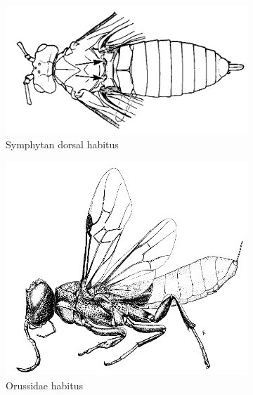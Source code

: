 \documentclass[letterpaper, 11pt]{article}
\begin{document}
\begin{figure}[ht!]
    \centering
    \begin{subfigure}[ht!]{0.45\textwidth}
        \includegraphics[width=\textwidth]{SymphytaHabitus}
        \caption{Symphytan dorsal habitus \citep[][pg. 42]{goulet1993hymenoptera}}
        \label{fig:symphyt1}
    \end{subfigure}
    \hfill 
    \begin{subfigure}[ht!]{0.45\textwidth}
        \includegraphics[width=\textwidth]{OrussidHabitus}
        \caption{Orussidae habitus \citep[][Fig. 24]{goulet1993hymenoptera}}
        \label{fig:orussid1}
    \end{subfigure}
    \caption{}\label{fig:symphytans}
\end{figure}
\end{document}
